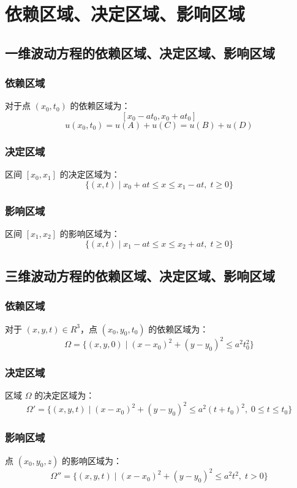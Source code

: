 \section{依赖区域、决定区域、影响区域}

\subsection{一维波动方程的依赖区域、决定区域、影响区域}

\subsubsection{依赖区域}
对于点 $(x_0, t_0)$ 的依赖区域为：
\[
[x_0 - at_0, x_0 + at_0]
\]
\[
u(x_0, t_0) = u(A) + u(C) = u(B) + u(D)
\]

\subsubsection{决定区域}
区间 $[x_0, x_1]$ 的决定区域为：
\[
\{ (x, t) \mid x_0 + at \leq x \leq x_1 - at, \; t \geq 0 \}
\]

\subsubsection{影响区域}
区间 $[x_1, x_2]$ 的影响区域为：
\[
\{ (x, t) \mid x_1 - at \leq x \leq x_2 + at, \; t \geq 0 \}
\]

\subsection{三维波动方程的依赖区域、决定区域、影响区域}

\subsubsection{依赖区域}
对于 $(x, y, t) \in R^3$，点 $(x_0, y_0, t_0)$ 的依赖区域为：
\[
\Omega = \{ (x, y, 0) \mid (x - x_0)^2 + (y - y_0)^2 \leq a^2 t_0^2 \}
\]

\subsubsection{决定区域}
区域 $\Omega$ 的决定区域为：
\[
\Omega' = \{ (x, y, t) \mid (x - x_0)^2 + (y - y_0)^2 \leq a^2(t + t_0)^2, \; 0 \leq t \leq t_0 \}
\]

\subsubsection{影响区域}
点 $(x_0, y_0, z)$ 的影响区域为：
\[
\Omega'' = \{ (x, y, t) \mid (x - x_0)^2 + (y - y_0)^2 \leq a^2 t^2, \; t > 0 \}
\]
